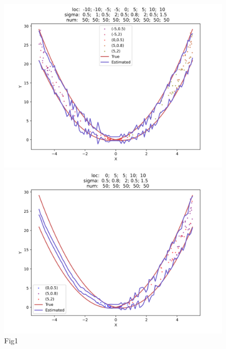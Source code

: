 \documentclass[12pt, a4paper, oneside]{article}
\begin{document}
\begin{figure}[htbp]
\begin{minipage}{0.495\linewidth}
            \centering
            \includegraphics[width=0.98\linewidth]{fig/Ex1_1/SPARSEFULL.png}
        \end{minipage}
        \begin{minipage}{0.495\linewidth}
            \centering
            \includegraphics[width=0.98\linewidth]{fig/Ex1_1/SPARSEPART.png}
        \end{minipage}
        \caption{Fig1}
        \label{Fig1}
    \end{figure}
\end{document}
